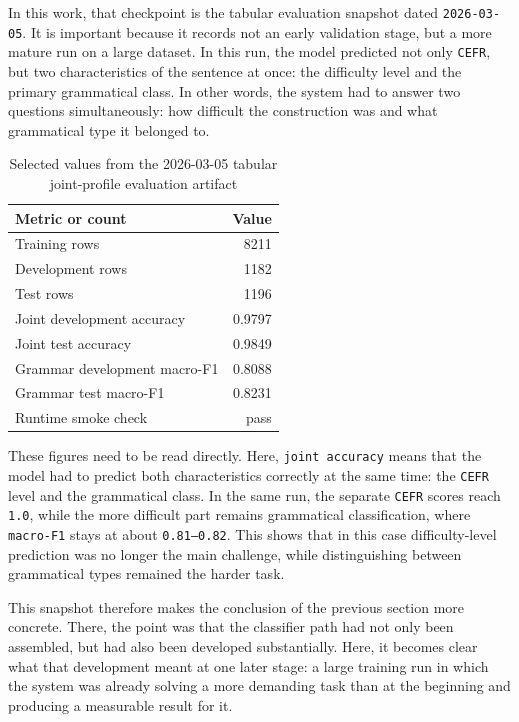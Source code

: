 \documentclass[12pt,a4paper,oneside]{report}
\begin{document}
In this work, that checkpoint is the tabular evaluation snapshot dated \texttt{2026-03-05}. It is important because it records not an early validation stage, but a more mature run on a large dataset. In this run, the model predicted not only \texttt{CEFR}, but two characteristics of the sentence at once: the difficulty level and the primary grammatical class. In other words, the system had to answer two questions simultaneously: how difficult the construction was and what grammatical type it belonged to.

\begin{table}[H]
  \centering
  \caption{Selected values from the 2026-03-05 tabular joint-profile evaluation artifact}
  \begin{tabular}{lr}
    \toprule
    Metric or count & Value \\
    \midrule
    Training rows & 8211 \\
    Development rows & 1182 \\
    Test rows & 1196 \\
    Joint development accuracy & 0.9797 \\
    Joint test accuracy & 0.9849 \\
    Grammar development macro-F1 & 0.8088 \\
    Grammar test macro-F1 & 0.8231 \\
    Runtime smoke check & pass \\
    \bottomrule
  \end{tabular}
\end{table}

These figures need to be read directly. Here, \texttt{joint accuracy} means that the model had to predict both characteristics correctly at the same time: the \texttt{CEFR} level and the grammatical class. In the same run, the separate \texttt{CEFR} scores reach \texttt{1.0}, while the more difficult part remains grammatical classification, where \texttt{macro-F1} stays at about \texttt{0.81--0.82}. This shows that in this case difficulty-level prediction was no longer the main challenge, while distinguishing between grammatical types remained the harder task.

This snapshot therefore makes the conclusion of the previous section more concrete. There, the point was that the classifier path had not only been assembled, but had also been developed substantially. Here, it becomes clear what that development meant at one later stage: a large training run in which the system was already solving a more demanding task than at the beginning and producing a measurable result for it.
\end{document}
